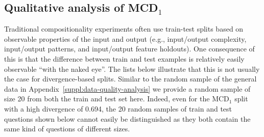 \documentclass[letterpaper]{article}
\newcommand{\MCD}[1]{MCD$_{#1}$}
\begin{document}
\subsection{Qualitative analysis of \MCD{1}}
\label{suppl:split-analysis-qualitative}
Traditional compositionality experiments often use train-test splits based on observable properties of the input and output (e.g., input/output complexity, input/output patterns, and input/output feature holdouts).
One consequence of this is that the difference between train and test examples is relatively easily observable ``with the naked eye''. 
The lists below illustrate that this is not usually the case for divergence-based splits. Similar to the random sample of the general data in Appendix~\ref{suppl:data-quality-analysis} we provide a random sample of size 20 from both the train and test set here.
Indeed, even for the \MCD{1} split with a high divergence of 0.694, the 20 random samples of train and test questions shown below cannot easily be distinguished as they both contain the same kind of questions of different sizes.
\end{document}

